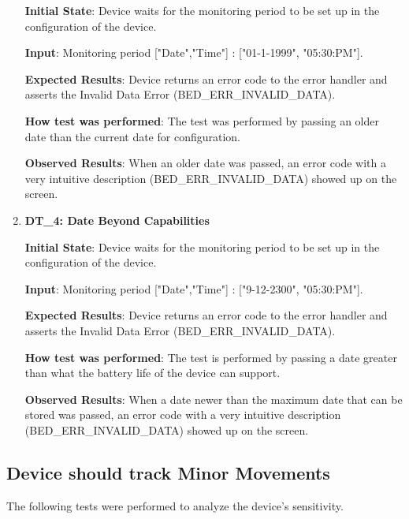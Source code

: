 \documentclass[12pt, titlepage]{article}
\begin{document}
\begin{enumerate}
  \textbf{Initial State}: Device waits for the monitoring period to be set up in the configuration of the device.

  \textbf{Input}: Monitoring period ["Date","Time"] : ["01-1-1999", "05:30:PM"].

  \textbf{Expected Results}: Device returns an error code to the error handler and asserts the Invalid Data Error (BED\_ERR\_INVALID\_DATA).

  \textbf{How test was performed}: The test was performed by passing an older date than the current date for configuration.

  \textbf{Observed Results}: When an older date was passed, an error code with a very intuitive description (BED\_ERR\_INVALID\_DATA) showed up on the screen.

  \item{\textbf{DT\_4: Date Beyond Capabilities}\\}\label{DT4}

  \textbf{Initial State}: Device waits for the monitoring period to be set up in the configuration of the device.

  \textbf{Input}: Monitoring period ["Date","Time"] : ["9-12-2300", "05:30:PM"].

  \textbf{Expected Results}: Device returns an error code to the error handler and asserts the Invalid Data Error (BED\_ERR\_INVALID\_DATA).

  \textbf{How test was performed}: The test is performed by passing a date greater than what the battery life of the device can support.

  \textbf{Observed Results}: When a date newer than the maximum date that can be stored was passed, an error code with a very intuitive description (BED\_ERR\_INVALID\_DATA) showed up on the screen.
\end{enumerate}

\subsection{Device should track Minor Movements}
The following tests were performed to analyze the device's sensitivity.
\end{document}
